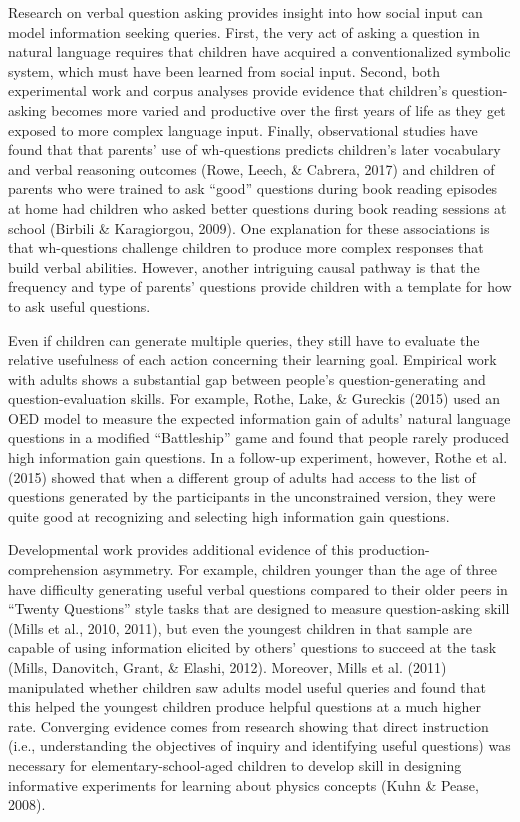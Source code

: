 \documentclass[oneside]{report}
\begin{document}
Research on verbal question asking provides insight into how social
input can model information seeking queries. First, the very act of
asking a question in natural language requires that children have
acquired a conventionalized symbolic system, which must have been
learned from social input. Second, both experimental work and corpus
analyses provide evidence that children's question-asking becomes more
varied and productive over the first years of life as they get exposed
to more complex language input. Finally, observational studies have
found that that parents' use of wh-questions predicts children's later
vocabulary and verbal reasoning outcomes (Rowe, Leech, \& Cabrera, 2017)
and children of parents who were trained to ask ``good'' questions
during book reading episodes at home had children who asked better
questions during book reading sessions at school (Birbili \&
Karagiorgou, 2009). One explanation for these associations is that
wh-questions challenge children to produce more complex responses that
build verbal abilities. However, another intriguing causal pathway is
that the frequency and type of parents' questions provide children with
a template for how to ask useful questions.

Even if children can generate multiple queries, they still have to
evaluate the relative usefulness of each action concerning their
learning goal. Empirical work with adults shows a substantial gap
between people's question-generating and question-evaluation skills. For
example, Rothe, Lake, \& Gureckis (2015) used an OED model to measure
the expected information gain of adults' natural language questions in a
modified ``Battleship'' game and found that people rarely produced high
information gain questions. In a follow-up experiment, however, Rothe et
al. (2015) showed that when a different group of adults had access to
the list of questions generated by the participants in the unconstrained
version, they were quite good at recognizing and selecting high
information gain questions.

Developmental work provides additional evidence of this
production-comprehension asymmetry. For example, children younger than
the age of three have difficulty generating useful verbal questions
compared to their older peers in ``Twenty Questions'' style tasks that
are designed to measure question-asking skill (Mills et al., 2010,
2011), but even the youngest children in that sample are capable of
using information elicited by others' questions to succeed at the task
(Mills, Danovitch, Grant, \& Elashi, 2012). Moreover, Mills et al.
(2011) manipulated whether children saw adults model useful queries and
found that this helped the youngest children produce helpful questions
at a much higher rate. Converging evidence comes from research showing
that direct instruction (i.e., understanding the objectives of inquiry
and identifying useful questions) was necessary for
elementary-school-aged children to develop skill in designing
informative experiments for learning about physics concepts (Kuhn \&
Pease, 2008).
\end{document}

